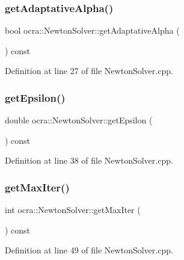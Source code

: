 \subsubsection{\texorpdfstring{get\+Adaptative\+Alpha()}{getAdaptativeAlpha()}}
{\footnotesize\ttfamily bool ocra\+::\+Newton\+Solver\+::get\+Adaptative\+Alpha (\begin{DoxyParamCaption}{ }\end{DoxyParamCaption}) const}



Definition at line 27 of file Newton\+Solver.\+cpp.

\hypertarget{classocra_1_1NewtonSolver_a33f31688cb71c2ed817e3dbd40c0352f}{}\label{classocra_1_1NewtonSolver_a33f31688cb71c2ed817e3dbd40c0352f} 
\subsubsection{\texorpdfstring{get\+Epsilon()}{getEpsilon()}}
{\footnotesize\ttfamily double ocra\+::\+Newton\+Solver\+::get\+Epsilon (\begin{DoxyParamCaption}{ }\end{DoxyParamCaption}) const}



Definition at line 38 of file Newton\+Solver.\+cpp.

\hypertarget{classocra_1_1NewtonSolver_a044aa506a35d0a60bf8c5e4e7108dfae}{}\label{classocra_1_1NewtonSolver_a044aa506a35d0a60bf8c5e4e7108dfae} 
\subsubsection{\texorpdfstring{get\+Max\+Iter()}{getMaxIter()}}
{\footnotesize\ttfamily int ocra\+::\+Newton\+Solver\+::get\+Max\+Iter (\begin{DoxyParamCaption}{ }\end{DoxyParamCaption}) const}



Definition at line 49 of file Newton\+Solver.\+cpp.

\hypertarget{classocra_1_1NewtonSolver_a92d33f1dfe684de2051d0389816cf9a5}{}\label{classocra_1_1NewtonSolver_a92d33f1dfe684de2051d0389816cf9a5} 
